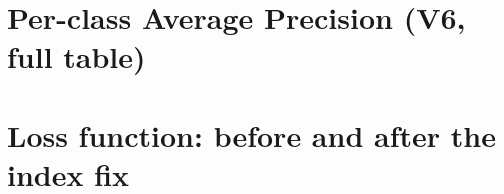 \documentclass[11pt,a4paper]{article}
\begin{document}
\appendix
\section{Per-class Average Precision (V6, full table)}
\label{app:per-class-ap}


\section{Loss function: before and after the index fix}
\label{app:loss-diff}

\end{document}
